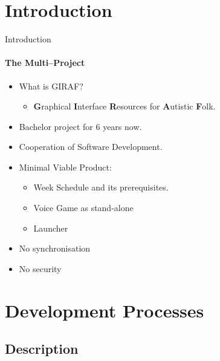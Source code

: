 \section{Introduction}
    \begin{frame}[t]{Introduction}\framesubtitle{The Multi--Project}
        \begin{itemize}
	        \item What is GIRAF?
	        	\begin{itemize}
	        		\item \textbf{G}raphical \textbf{I}nterface \textbf{R}esources for \textbf{A}utistic \textbf{F}olk.
	        	\end{itemize}
        	\item Bachelor project for 6 years now.
        	\item Cooperation of Software Development.
        	\item Minimal Viable Product:
        		\begin{itemize}
        			\item Week Schedule and its prerequisites.
        			\item Voice Game as stand-alone
        			\item Launcher 
        		\end{itemize}
    			\item No synchronisation
    			\item No security
    		\end{itemize}
    \end{frame}

\section{Development Processes}
	\subsection{Description}

